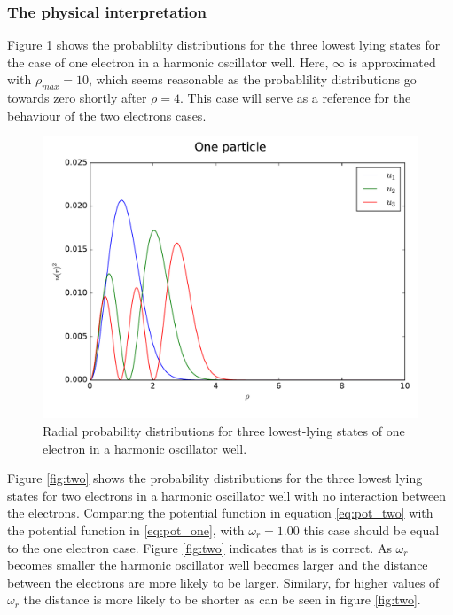 \documentclass{article}
\begin{document}
\subsubsection{The physical interpretation}

Figure \ref{fig:one} shows the probablilty distributions for the three lowest lying states for the case of one electron in a harmonic oscillator well. Here, $\infty$ is approximated with $\rho_{max}=10$, which seems reasonable as the probablility distributions go towards zero shortly after $\rho=4$. This case will serve as a reference for the behaviour of the two electrons cases.

\begin{figure}[h]
    \centering
    \includegraphics[width=0.8\linewidth]{fig/One_particle.pdf}
    \caption{Radial probability distributions for three lowest-lying states of one electron in a harmonic oscillator well.}
    \label{fig:one}
\end{figure}

Figure \ref{fig:two} shows the probability distributions for the three lowest lying states for two electrons in a harmonic oscillator well with no interaction between the electrons. Comparing the potential function in equation \ref{eq:pot_two} with the potential function in \ref{eq:pot_one}, with $\omega_r=1.00$ this case should be equal to the one electron case. Figure \ref{fig:two} indicates that is is correct. As $\omega_r$ becomes smaller the harmonic oscillator well becomes larger and the distance between the electrons are more likely to be larger. Similary, for higher values of $\omega_r$ the distance is more likely to be shorter as can be seen in figure \ref{fig:two}.
\end{document}
